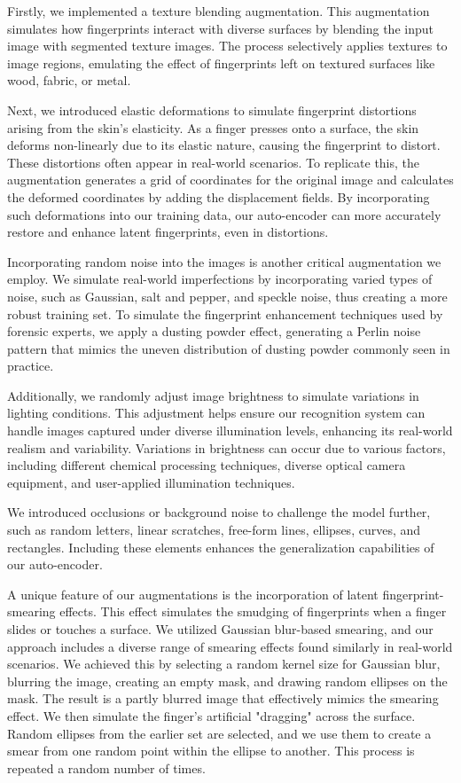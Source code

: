 \documentclass[twocolumn, switch]{article} %
\begin{document}
Firstly, we implemented a texture blending augmentation. This augmentation simulates how fingerprints interact with diverse surfaces by blending the input image with segmented texture images. The process selectively applies textures to image regions, emulating the effect of fingerprints left on textured surfaces like wood, fabric, or metal.

Next, we introduced elastic deformations to simulate fingerprint distortions arising from the skin's elasticity. As a finger presses onto a surface, the skin deforms non-linearly due to its elastic nature, causing the fingerprint to distort. These distortions often appear in real-world scenarios. To replicate this, the augmentation generates a grid of coordinates for the original image and calculates the deformed coordinates by adding the displacement fields. By incorporating such deformations into our training data, our auto-encoder can more accurately restore and enhance latent fingerprints, even in distortions.

Incorporating random noise into the images is another critical augmentation we employ. We simulate real-world imperfections by incorporating varied types of noise, such as Gaussian, salt and pepper, and speckle noise, thus creating a more robust training set. To simulate the fingerprint enhancement techniques used by forensic experts, we apply a dusting powder effect, generating a Perlin noise \cite{perlin1985image} pattern that mimics the uneven distribution of dusting powder commonly seen in practice.

Additionally, we randomly adjust image brightness to simulate variations in lighting conditions. This adjustment helps ensure our recognition system can handle images captured under diverse illumination levels, enhancing its real-world realism and variability. Variations in brightness can occur due to various factors, including different chemical processing techniques, diverse optical camera equipment, and user-applied illumination techniques.

We introduced occlusions or background noise to challenge the model further, such as random letters, linear scratches, free-form lines, ellipses, curves, and rectangles. Including these elements enhances the generalization capabilities of our auto-encoder.

A unique feature of our augmentations is the incorporation of latent fingerprint-smearing effects. This effect simulates the smudging of fingerprints when a finger slides or touches a surface. We utilized Gaussian blur-based smearing, and our approach includes a diverse range of smearing effects found similarly in real-world scenarios. We achieved this by selecting a random kernel size for Gaussian blur, blurring the image, creating an empty mask, and drawing random ellipses on the mask. The result is a partly blurred image that effectively mimics the smearing effect. We then simulate the finger's artificial "dragging" across the surface. Random ellipses from the earlier set are selected, and we use them to create a smear from one random point within the ellipse to another. This process is repeated a random number of times.
\end{document}
